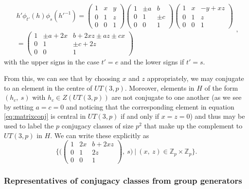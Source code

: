 \documentclass[12pt]{article}
\theoremstyle{definition}
\begin{document}
\begin{equation}
\begin{gathered}
h'\phi_{t'}(h)\phi_s(h'^{-1}) =
\begin{pmatrix}
1 & x & y \\
0 & 1 & z \\
0 & 0 & 1
\end{pmatrix}
\begin{pmatrix}
1 & \pm a & b \\
0 & 1 & \pm c \\
0 & 0 & 1
\end{pmatrix}
\begin{pmatrix}
1 & x & -y + xz \\
0 & 1 & z \\
0 & 0 & 1
\end{pmatrix} \\
=
\begin{pmatrix}
1 & \pm a + 2x & b + 2xz \pm az \pm cx \\
0 & 1 & \pm c + 2z \\
0 & 0 & 1
\end{pmatrix}
\end{gathered},
\label{eq:matrixconj}
\end{equation}
with the upper signs in the case $t' = e$ and the lower signs if $t' = s$.

From this, we can see that by choosing $x$ and $z$ appropriately, we may conjugate to an element in the centre of $UT(3,p)$. Moreover, elements in $H$ of the form $(h_c,~s)$ with $h_c \in Z(UT(3,p))$ are not conjugate to one another (as we see by setting $a=c=0$ and noticing that the corresponding element in equation \ref{eq:matrixconj} is central in $UT(3,p)$ if and only if $x=z=0$) and thus may be used to label the $p$ conjugacy classes of size $p^2$ that make up the complement to $UT(3,p)$ in $H$. We can write these explicitly as
\begin{equation}
\bigg\{ \bigg(
\begin{pmatrix}
1 & 2x & b + 2xz \\
0 & 1 & 2z \\
0 & 0 & 1
\end{pmatrix},~s \bigg)~|~(x,~z) \in \mathbb{Z}_p \times \mathbb{Z}_p \bigg\}.
\end{equation}

\subsubsection*{Representatives of conjugacy classes from group generators}
\end{document}
